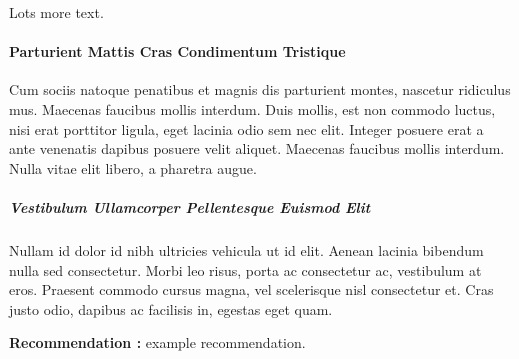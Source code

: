 \documentclass[a4paper,11pt]{article}
\newcounter{Recommendations}
\newcommand{\recommendation}[1]
{\stepcounter{Recommendations}\textbf{Recommendation \theRecommendations:} #1}
\begin{document}
Lots more text\cite{ea1918cth}.

\paragraph{Parturient Mattis Cras Condimentum Tristique}

Cum sociis natoque penatibus et magnis dis parturient montes, nascetur ridiculus mus. Maecenas faucibus mollis interdum. Duis mollis, est non commodo luctus, nisi erat porttitor ligula, eget lacinia odio sem nec elit. Integer posuere erat a ante venenatis dapibus posuere velit aliquet. Maecenas faucibus mollis interdum. Nulla vitae elit libero, a pharetra augue.

\subparagraph{Vestibulum Ullamcorper Pellentesque Euismod Elit}

Nullam id dolor id nibh ultricies vehicula ut id elit. Aenean lacinia bibendum nulla sed consectetur. Morbi leo risus, porta ac consectetur ac, vestibulum at eros. Praesent commodo cursus magna, vel scelerisque nisl consectetur et. Cras justo odio, dapibus ac facilisis in, egestas eget quam.

\vspace{1em}
\begin{framed}
\recommendation{example recommendation.}
\end{framed}
\end{document}
